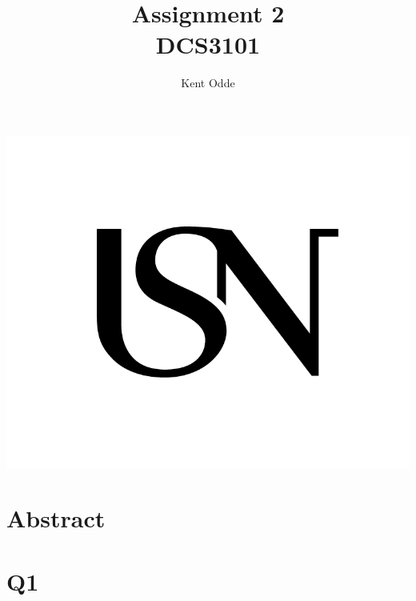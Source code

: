 \documentclass{article}
\begin{document}
\author{Kent Odde}
\title{Assignment 2 \\DCS3101}

\maketitle
\thispagestyle{empty}
\begin{center}
\includegraphics[width=\linewidth,height=0.2\textheight,keepaspectratio]{img/USN.png}
\end{center}
\newpage

\tableofcontents

\newpage

\section{Abstract}

\section{Q1}
\end{document}

